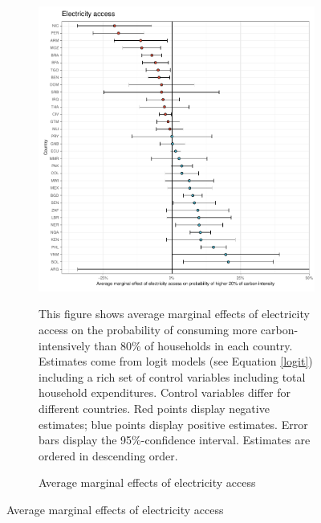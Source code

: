  \begin{figure}[ht!]\ContinuedFloat
   \centering
   \begin{subfigure}[b]{\textwidth}
   \centering
   \includegraphics{1_Figures/Analysis_Logit_Models_Marginal_Effects/Average_Marginal_Effects_affected_upper_80_electricity.access_2017B.pdf}
   \caption{Average marginal effects of electricity access} \label{fig:Logit_ME_electricity}
   \begin{subcaption2}
     This figure shows average marginal effects of electricity access on the probability of consuming more carbon-intensively than 80\% of households in each country. Estimates come from logit models (see Equation \ref{logit}) including a rich set of control variables including total household expenditures. Control variables differ for different countries. Red points display negative estimates; blue points display positive estimates. Error bars display the 95\%-confidence interval. Estimates are ordered in descending order.
   \end{subcaption2}
   \end{subfigure}
 \end{figure}
 \clearpage

